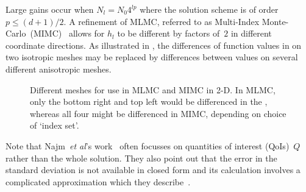 Large gains occur when
$N_l=N_0 4^{lp}$ where the solution scheme is of order~$p\leq(d+1)/2$.
A refinement of MLMC, referred to as Multi-Index Monte-Carlo~(MIMC)~\cite{Ha18Mult}
allows for $h_l$ to be different by factors of~$2$ in  different coordinate directions.
As illustrated in ,
the differences of function values in  on two isotropic meshes may be replaced by
differences between values on several different anisotropic meshes.
\begin{figure}[hbtp]
\centerline{}
\caption{Different meshes for use in MLMC and MIMC in 2-D. In MLMC, only the
bottom right and top left would be differenced in the \protect{},
whereas all four might be differenced in MIMC, depending on choice of `index set'.
\label{fig:mimc}}
\end{figure}


Note that Najm~\emph{et al}'s work~\cite{Ge19Prog} often focusses on quantities of interest (QoIs)~$Q$ rather
than the whole solution. They also point out that the error in the 
standard deviation is not available in closed form and its calculation 
involves a complicated approximation which they describe~\cite[\S\,III.B.1]{Ge19Prog}.  

%
%

